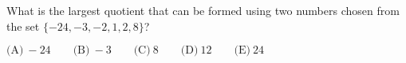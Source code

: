 

What is the largest quotient that can be formed using two numbers chosen from the set $\{ -24, -3, -2, 1, 2, 8 \}$?

$\text{(A)}\ -24 \qquad \text{(B)}\ -3 \qquad \text{(C)}\ 8 \qquad \text{(D)}\ 12 \qquad \text{(E)}\ 24$
